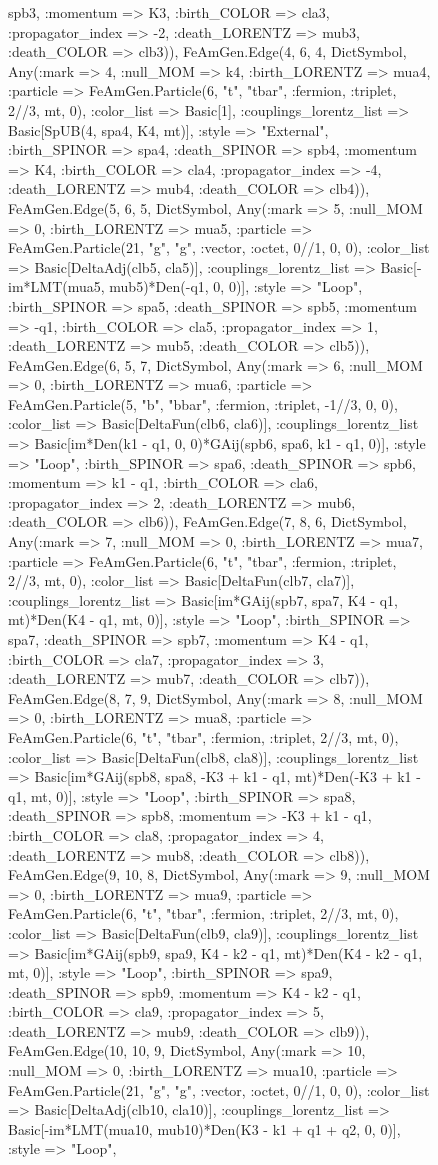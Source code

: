 \documentclass{revtex4}
\begin{document}
\begin{figure}[!htb]
\begin{center}
{spb3, :momentum => K3, :birth_COLOR => cla3, :propagator_index => -2, :death_LORENTZ => mub3, :death_COLOR => clb3)), FeAmGen.Edge(4, 6, 4, Dict{Symbol, Any}(:mark => 4, :null_MOM => k4, :birth_LORENTZ => mua4, :particle => FeAmGen.Particle(6, "t", "tbar", :fermion, :triplet, 2//3, mt, 0), :color_list => Basic[1], :couplings_lorentz_list => Basic[SpUB(4, spa4, K4, mt)], :style => "External", :birth_SPINOR => spa4, :death_SPINOR => spb4, :momentum => K4, :birth_COLOR => cla4, :propagator_index => -4, :death_LORENTZ => mub4, :death_COLOR => clb4)), FeAmGen.Edge(5, 6, 5, Dict{Symbol, Any}(:mark => 5, :null_MOM => 0, :birth_LORENTZ => mua5, :particle => FeAmGen.Particle(21, "g", "g", :vector, :octet, 0//1, 0, 0), :color_list => Basic[DeltaAdj(clb5, cla5)], :couplings_lorentz_list => Basic[-im*LMT(mua5, mub5)*Den(-q1, 0, 0)], :style => "Loop", :birth_SPINOR => spa5, :death_SPINOR => spb5, :momentum => -q1, :birth_COLOR => cla5, :propagator_index => 1, :death_LORENTZ => mub5, :death_COLOR => clb5)), FeAmGen.Edge(6, 5, 7, Dict{Symbol, Any}(:mark => 6, :null_MOM => 0, :birth_LORENTZ => mua6, :particle => FeAmGen.Particle(5, "b", "bbar", :fermion, :triplet, -1//3, 0, 0), :color_list => Basic[DeltaFun(clb6, cla6)], :couplings_lorentz_list => Basic[im*Den(k1 - q1, 0, 0)*GAij(spb6, spa6, k1 - q1, 0)], :style => "Loop", :birth_SPINOR => spa6, :death_SPINOR => spb6, :momentum => k1 - q1, :birth_COLOR => cla6, :propagator_index => 2, :death_LORENTZ => mub6, :death_COLOR => clb6)), FeAmGen.Edge(7, 8, 6, Dict{Symbol, Any}(:mark => 7, :null_MOM => 0, :birth_LORENTZ => mua7, :particle => FeAmGen.Particle(6, "t", "tbar", :fermion, :triplet, 2//3, mt, 0), :color_list => Basic[DeltaFun(clb7, cla7)], :couplings_lorentz_list => Basic[im*GAij(spb7, spa7, K4 - q1, mt)*Den(K4 - q1, mt, 0)], :style => "Loop", :birth_SPINOR => spa7, :death_SPINOR => spb7, :momentum => K4 - q1, :birth_COLOR => cla7, :propagator_index => 3, :death_LORENTZ => mub7, :death_COLOR => clb7)), FeAmGen.Edge(8, 7, 9, Dict{Symbol, Any}(:mark => 8, :null_MOM => 0, :birth_LORENTZ => mua8, :particle => FeAmGen.Particle(6, "t", "tbar", :fermion, :triplet, 2//3, mt, 0), :color_list => Basic[DeltaFun(clb8, cla8)], :couplings_lorentz_list => Basic[im*GAij(spb8, spa8, -K3 + k1 - q1, mt)*Den(-K3 + k1 - q1, mt, 0)], :style => "Loop", :birth_SPINOR => spa8, :death_SPINOR => spb8, :momentum => -K3 + k1 - q1, :birth_COLOR => cla8, :propagator_index => 4, :death_LORENTZ => mub8, :death_COLOR => clb8)), FeAmGen.Edge(9, 10, 8, Dict{Symbol, Any}(:mark => 9, :null_MOM => 0, :birth_LORENTZ => mua9, :particle => FeAmGen.Particle(6, "t", "tbar", :fermion, :triplet, 2//3, mt, 0), :color_list => Basic[DeltaFun(clb9, cla9)], :couplings_lorentz_list => Basic[im*GAij(spb9, spa9, K4 - k2 - q1, mt)*Den(K4 - k2 - q1, mt, 0)], :style => "Loop", :birth_SPINOR => spa9, :death_SPINOR => spb9, :momentum => K4 - k2 - q1, :birth_COLOR => cla9, :propagator_index => 5, :death_LORENTZ => mub9, :death_COLOR => clb9)), FeAmGen.Edge(10, 10, 9, Dict{Symbol, Any}(:mark => 10, :null_MOM => 0, :birth_LORENTZ => mua10, :particle => FeAmGen.Particle(21, "g", "g", :vector, :octet, 0//1, 0, 0), :color_list => Basic[DeltaAdj(clb10, cla10)], :couplings_lorentz_list => Basic[-im*LMT(mua10, mub10)*Den(K3 - k1 + q1 + q2, 0, 0)], :style => "Loop", }
\end{center}
\end{figure}
\end{document}
